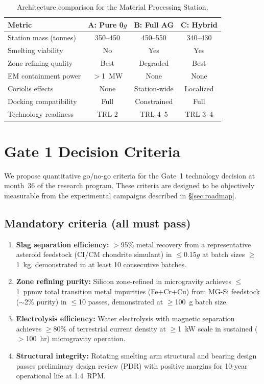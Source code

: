 \documentclass[preprint,12pt]{elsarticle}
\begin{document}
\begin{table}[ht]
\centering
\caption{Architecture comparison for the Material Processing Station.}
\label{tab:architecture-comparison}
\begin{tabular}{lccc}
\toprule
\textbf{Metric} & \textbf{A: Pure 0$g$} & \textbf{B: Full AG} & \textbf{C: Hybrid} \\
\midrule
Station mass (tonnes) & 350--450 & 450--550 & 340--430 \\
Smelting viability & No & Yes & Yes \\
Zone refining quality & Best & Degraded & Best \\
EM containment power & $>$1~MW & None & None \\
Coriolis effects & None & Station-wide & Localized \\
Docking compatibility & Full & Constrained & Full \\
Technology readiness & TRL 2 & TRL 4--5 & TRL 3--4 \\
\bottomrule
\end{tabular}
\end{table}

\section{Gate 1 Decision Criteria}
\label{sec:gate1}

We propose quantitative go/no-go criteria for the Gate~1 technology decision at month~36 of the research program. These criteria are designed to be objectively measurable from the experimental campaigns described in \S\ref{sec:roadmap}.

\subsection{Mandatory criteria (all must pass)}

\begin{enumerate}
    \item \textbf{Slag separation efficiency:} $>$95\% metal recovery from a representative asteroid feedstock (CI/CM chondrite simulant) in $\leq$0.15$g$ at batch sizes $\geq$1~kg, demonstrated in at least 10 consecutive batches.
    \item \textbf{Zone refining purity:} Silicon zone-refined in microgravity achieves $\leq$1~ppmw total transition metal impurities (Fe+Cr+Cu) from MG-Si feedstock ($\sim$2\% purity) in $\leq$10 passes, demonstrated at $\geq$100~g batch size.
    \item \textbf{Electrolysis efficiency:} Water electrolysis with magnetic separation achieves $\geq$80\% of terrestrial current density at $\geq$1~kW scale in sustained ($>$100~hr) microgravity operation.
    \item \textbf{Structural integrity:} Rotating smelting arm structural and bearing design passes preliminary design review (PDR) with positive margins for 10-year operational life at 1.4~RPM.
\end{enumerate}
\end{document}

